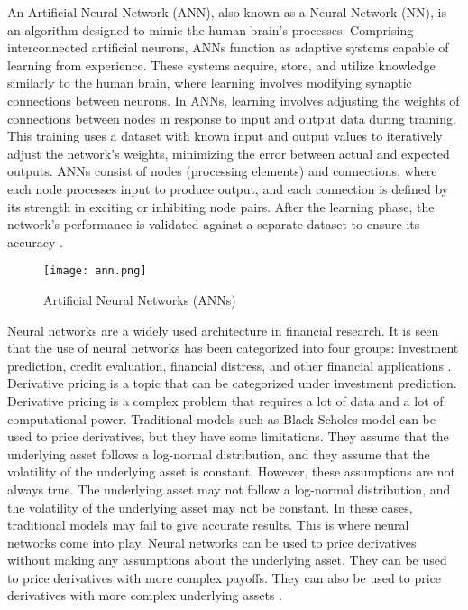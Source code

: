 \documentclass[12pt, a4paper]{article}
\begin{document}
An Artificial Neural Network (ANN), also known as a Neural Network (NN), is an algorithm designed to mimic the human brain's processes. Comprising interconnected artificial neurons, ANNs function as adaptive systems capable of learning from experience. These systems acquire, store, and utilize knowledge similarly to the human brain, where learning involves modifying synaptic connections between neurons. In ANNs, learning involves adjusting the weights of connections between nodes in response to input and output data during training. This training uses a dataset with known input and output values to iteratively adjust the network's weights, minimizing the error between actual and expected outputs. ANNs consist of nodes (processing elements) and connections, where each node processes input to produce output, and each connection is defined by its strength in exciting or inhibiting node pairs. After the learning phase, the network's performance is validated against a separate dataset to ensure its accuracy \cite{4}.\\

\begin{figure}[h]
\centering
\texttt{[image: ann.png]}
\caption{Artificial Neural Networks (ANNs)}
\end{figure}


Neural networks are a widely used architecture in financial research.  It is seen that the use of neural networks has been categorized into four groups: investment prediction, credit evaluation, financial distress, and other financial applications \cite{5}.  Derivative pricing is a topic that can be categorized under investment prediction.  Derivative pricing is a complex problem that requires a lot of data and a lot of computational power.  Traditional models such as Black-Scholes model can be used to price derivatives, but they have some limitations.  They assume that the underlying asset follows a log-normal distribution, and they assume that the volatility of the underlying asset is constant.  However, these assumptions are not always true.  The underlying asset may not follow a log-normal distribution, and the volatility of the underlying asset may not be constant.  In these cases, traditional models may fail to give accurate results.  This is where neural networks come into play.  Neural networks can be used to price derivatives without making any assumptions about the underlying asset.  They can be used to price derivatives with more complex payoffs.  They can also be used to price derivatives with more complex underlying assets \cite{4}.\\
\end{document}
